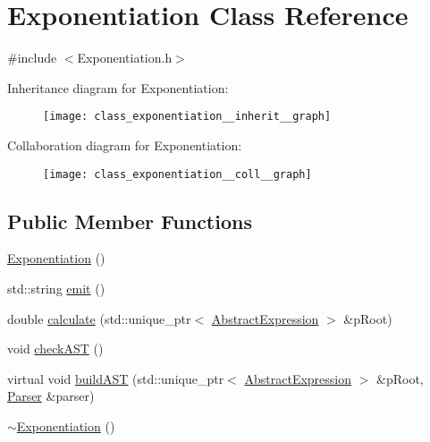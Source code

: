 \hypertarget{class_exponentiation}{}\section{Exponentiation Class Reference}
\label{class_exponentiation}


{\ttfamily \#include $<$Exponentiation.\+h$>$}



Inheritance diagram for Exponentiation\+:
\nopagebreak
\begin{figure}[H]
\begin{center}
\leavevmode
\texttt{[image: class\_exponentiation\_\_inherit\_\_graph]}
\end{center}
\end{figure}


Collaboration diagram for Exponentiation\+:
\nopagebreak
\begin{figure}[H]
\begin{center}
\leavevmode
\texttt{[image: class\_exponentiation\_\_coll\_\_graph]}
\end{center}
\end{figure}
\subsection*{Public Member Functions}
\begin{DoxyCompactItemize}
\item 
\mbox{\hyperlink{class_exponentiation_ae79937f14e7e06551272222eee26be58}{Exponentiation}} ()
\item 
std\+::string \mbox{\hyperlink{class_exponentiation_a3cc7a07711deedbb2bf4125b55b2ef1f}{emit}} ()
\item 
double \mbox{\hyperlink{class_exponentiation_ab04f25d16cb5a51d71acdb9ac600c745}{calculate}} (std\+::unique\+\_\+ptr$<$ \mbox{\hyperlink{class_abstract_expression}{Abstract\+Expression}} $>$ \&p\+Root)
\item 
void \mbox{\hyperlink{class_exponentiation_ae7f0d75fef03d8121d812c591ba6e43f}{check\+A\+ST}} ()
\item 
virtual void \mbox{\hyperlink{class_exponentiation_a7c600d4b547358c563edfc76ae8ac8a6}{build\+A\+ST}} (std\+::unique\+\_\+ptr$<$ \mbox{\hyperlink{class_abstract_expression}{Abstract\+Expression}} $>$ \&p\+Root, \mbox{\hyperlink{class_parser}{Parser}} \&parser)
\item 
\mbox{\hyperlink{class_exponentiation_a626e91a0ebf2723770a1b6d53ff5a9d2}{$\sim$\+Exponentiation}} ()
\end{DoxyCompactItemize}
